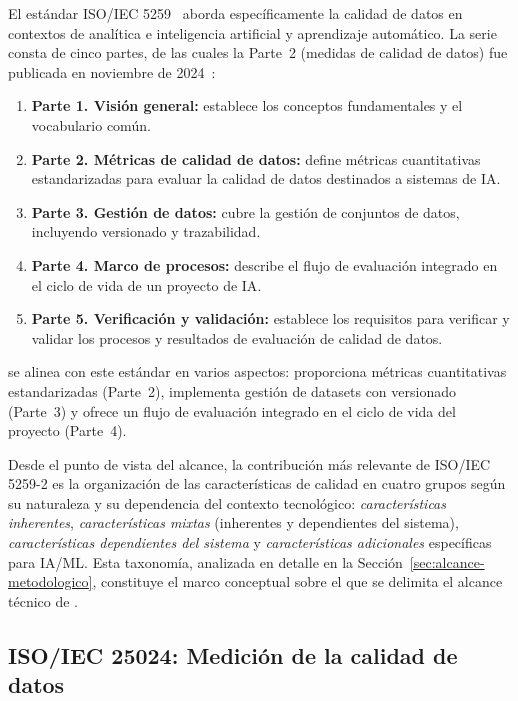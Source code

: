 El estándar \ac{ISO}/IEC 5259~\citep{iso5259} aborda específicamente la
calidad de datos en contextos de analítica e inteligencia artificial y
aprendizaje automático. La serie consta de cinco partes, de las cuales la
Parte~2 (medidas de calidad de datos) fue publicada en noviembre de
2024~\citep{iso5259}:

\begin{enumerate}
  \item \textbf{Parte 1. Visión general:} establece los conceptos
    fundamentales y el vocabulario común.
  \item \textbf{Parte 2. Métricas de calidad de datos:} define
    métricas cuantitativas estandarizadas para evaluar la calidad de datos
    destinados a sistemas de \ac{IA}.
  \item \textbf{Parte 3. Gestión de datos:} cubre la gestión de
    conjuntos de datos, incluyendo versionado y trazabilidad.
  \item \textbf{Parte 4. Marco de procesos:} describe el flujo de
    evaluación integrado en el ciclo de vida de un proyecto de \ac{IA}.
  \item \textbf{Parte 5. Verificación y validación:} establece
    los requisitos para verificar y validar los procesos y resultados de
    evaluación de calidad de datos.
\end{enumerate}

\dataqual se alinea con este estándar en varios aspectos: proporciona métricas
cuantitativas estandarizadas (Parte~2), implementa gestión de datasets con
versionado (Parte~3) y ofrece un flujo de evaluación integrado en el ciclo de
vida del proyecto (Parte~4).

Desde el punto de vista del alcance, la contribución más relevante de
\ac{ISO}/IEC 5259-2 es la organización de las características de calidad en
cuatro grupos según su naturaleza y su dependencia del contexto tecnológico:
\emph{características inherentes}, \emph{características mixtas} (inherentes y
dependientes del sistema), \emph{características dependientes del sistema} y
\emph{características adicionales} específicas para \ac{IA}/\ac{ML}. Esta
taxonomía, analizada en detalle en la Sección~\ref{sec:alcance-metodologico},
constituye el marco conceptual sobre el que se delimita el alcance técnico de
\dataqual.

\subsection{ISO/IEC 25024: Medición de la calidad de datos}
\label{sec:iso25024}

